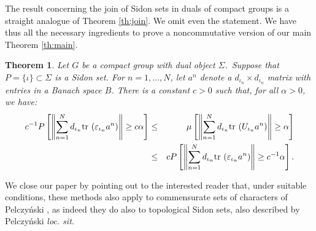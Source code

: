 The result concerning the join of Sidon sets in duals of compact groups
is a straight analogue of Theorem \ref{th:join}.  We omit even the
statement.
We have thus all the necessary ingredients to prove a noncommutative
version of our main Theorem \ref{th:main}.

\newtheorem{th:main.noncom}[join]{Theorem}
\begin{th:main.noncom}
Let $G$ be a compact group with dual object $\Sigma$.\  Suppose that
$P=\{\iota\}\subset\Sigma$ is a Sidon set.  For $n = 1, \ldots, N$, let
$a^n$ denote a $d_{\iota_n} \times d_{\iota_n}$ matrix with entries in a
Banach space $B$.  There is a constant $c>0$ such that, for all $\alpha
>0$, we have:
\begin{eqnarray}
c^{-1}P\left[\left\|\sum_{n=1}^Nd_{\iota_n}{\rm tr}\  (\varepsilon_{\iota_n}
a^n)\right\|
        \geq c\alpha\right]
        & \leq &
\mu\left[\left\|\sum_{n=1}^Nd_{\iota_n}{\rm tr}\  (U_{\iota_n} a^n) \right\|
        \geq \alpha\right] \nonumber \\
      & \leq &
cP\left[\left\|\sum_{n=1}^Nd_{\iota_n}{\rm tr}\  (\varepsilon_{\iota_n}
a^n)\right\|
        \geq c^{-1}\alpha\right].
\label{eq:main.noncom}
\end{eqnarray}
\label{th:main.noncom}
\end{th:main.noncom}

We close our paper by pointing out to the interested reader that,
under suitable conditions, these
methods also apply to commensurate sets of characters of
Pelczy\'nski \cite{bib:Pe}, as indeed they do also to
topological Sidon sets, also described by Pelczy\'nski {\em loc. sit.}

